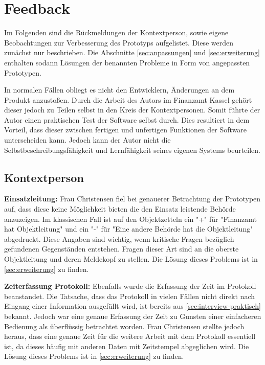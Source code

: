 \section{Feedback}\label{sec:feedbackPraktisch}

Im Folgenden sind die Rückmeldungen der Kontextperson, sowie eigene Beobachtungen zur Verbesserung des Prototyps aufgelistet.
Diese werden zunächst nur beschrieben.
Die Abschnitte \autoref{sec:anpassungen} und \autoref{sec:erweiterung} enthalten sodann Lösungen der benannten Probleme in Form von angepassten Prototypen.

In normalen Fällen obliegt es nicht den Entwicklern, Änderungen an dem Produkt anzustoßen.
Durch die Arbeit des Autors im Finanzamt Kassel gehört dieser jedoch zu Teilen selbst in den Kreis der Kontextpersonen.
Somit führte der Autor einen praktischen Test der Software selbst durch.
Dies resultiert in dem Vorteil, dass dieser zwischen fertigen und unfertigen Funktionen der Software unterscheiden kann.
Jedoch kann der Autor nicht die Selbstbeschreibungsfähigkeit und Lernfähigkeit seines eigenen Systems beurteilen.

\subsection{Kontextperson}\label{sec:feedbackPerson}

\textbf{Einsatzleitung:} Frau Christensen fiel bei genauerer Betrachtung der Prototypen auf, dass diese keine Möglichkeit bieten die den Einsatz leistende Behörde anzuzeigen.
Im klassischen Fall ist auf den Objektzetteln ein "+" für "Finanzamt hat Objektleitung" und ein "-" für "Eine andere Behörde hat die Objektleitung" abgedruckt.
Diese Angaben sind wichtig, wenn kritische Fragen bezüglich gefundenen Gegenständen entstehen.
Fragen dieser Art sind an die oberste Objektleitung und deren Meldekopf zu stellen.
Die Lösung dieses Problems ist in \autoref{sec:erweiterung} zu finden.


\textbf{Zeiterfassung Protokoll:} Ebenfalls wurde die Erfassung der Zeit im Protokoll beanstandet.
Die Tatsache, dass das Protokoll in vielen Fällen nicht direkt nach Eingang einer Information ausgefüllt wird, ist bereits aus \autoref{sec:interview-praktisch} bekannt.
Jedoch war eine genaue Erfassung der Zeit zu Gunsten einer einfacheren Bedienung als überflüssig betrachtet worden.
Frau Christensen stellte jedoch heraus, dass eine genaue Zeit für die weitere Arbeit mit dem Protokoll essentiell ist, da dieses häufig mit anderen Daten mit Zeitstempel abgeglichen wird.
Die Lösung dieses Problems ist in \autoref{sec:erweiterung} zu finden.

